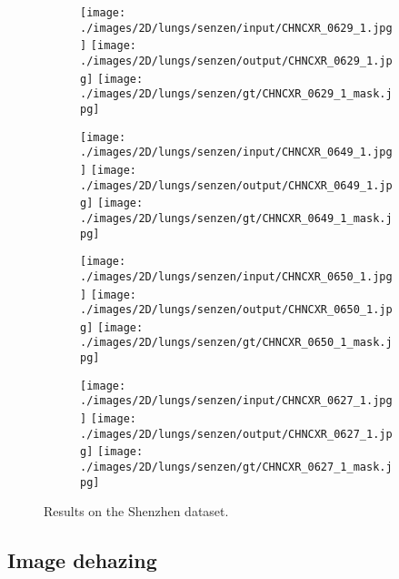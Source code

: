 \documentclass[12pt]{article}
\begin{document}
\begin{figure*}[h]
\centering
\begin{subfigure}[b]{0.220\linewidth}
\texttt{[image: ./images/2D/lungs/senzen/input/CHNCXR\_0629\_1.jpg]}
\texttt{[image: ./images/2D/lungs/senzen/output/CHNCXR\_0629\_1.jpg]}
\texttt{[image: ./images/2D/lungs/senzen/gt/CHNCXR\_0629\_1\_mask.jpg]}
\caption{}
\end{subfigure}
\begin{subfigure}[b]{0.2265\linewidth}
\texttt{[image: ./images/2D/lungs/senzen/input/CHNCXR\_0649\_1.jpg]}
\texttt{[image: ./images/2D/lungs/senzen/output/CHNCXR\_0649\_1.jpg]}
\texttt{[image: ./images/2D/lungs/senzen/gt/CHNCXR\_0649\_1\_mask.jpg]}
\caption{}
\end{subfigure}
\begin{subfigure}[b]{0.2005\linewidth}
\texttt{[image: ./images/2D/lungs/senzen/input/CHNCXR\_0650\_1.jpg]}
\texttt{[image: ./images/2D/lungs/senzen/output/CHNCXR\_0650\_1.jpg]}
\texttt{[image: ./images/2D/lungs/senzen/gt/CHNCXR\_0650\_1\_mask.jpg]}
\caption{}
\end{subfigure}
\begin{subfigure}[b]{0.2029\linewidth}
\texttt{[image: ./images/2D/lungs/senzen/input/CHNCXR\_0627\_1.jpg]}
\texttt{[image: ./images/2D/lungs/senzen/output/CHNCXR\_0627\_1.jpg]}
\texttt{[image: ./images/2D/lungs/senzen/gt/CHNCXR\_0627\_1\_mask.jpg]}
\caption{}
\end{subfigure}
\caption{Results on the Shenzhen  dataset.}
\label{fig:failure_cases_shenzen}
\end{figure*}



\subsection{Image dehazing}
\end{document}
